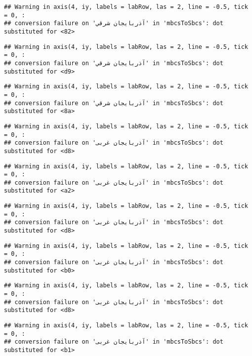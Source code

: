 \documentclass[
]{article}
\begin{document}
\begin{verbatim}
## Warning in axis(4, iy, labels = labRow, las = 2, line = -0.5, tick = 0, :
## conversion failure on 'آذربايجان شرقي' in 'mbcsToSbcs': dot substituted for <82>
\end{verbatim}

\begin{verbatim}
## Warning in axis(4, iy, labels = labRow, las = 2, line = -0.5, tick = 0, :
## conversion failure on 'آذربايجان شرقي' in 'mbcsToSbcs': dot substituted for <d9>
\end{verbatim}

\begin{verbatim}
## Warning in axis(4, iy, labels = labRow, las = 2, line = -0.5, tick = 0, :
## conversion failure on 'آذربايجان شرقي' in 'mbcsToSbcs': dot substituted for <8a>
\end{verbatim}

\begin{verbatim}
## Warning in axis(4, iy, labels = labRow, las = 2, line = -0.5, tick = 0, :
## conversion failure on 'آذربايجان غربی' in 'mbcsToSbcs': dot substituted for <d8>
\end{verbatim}

\begin{verbatim}
## Warning in axis(4, iy, labels = labRow, las = 2, line = -0.5, tick = 0, :
## conversion failure on 'آذربايجان غربی' in 'mbcsToSbcs': dot substituted for <a2>
\end{verbatim}

\begin{verbatim}
## Warning in axis(4, iy, labels = labRow, las = 2, line = -0.5, tick = 0, :
## conversion failure on 'آذربايجان غربی' in 'mbcsToSbcs': dot substituted for <d8>
\end{verbatim}

\begin{verbatim}
## Warning in axis(4, iy, labels = labRow, las = 2, line = -0.5, tick = 0, :
## conversion failure on 'آذربايجان غربی' in 'mbcsToSbcs': dot substituted for <b0>
\end{verbatim}

\begin{verbatim}
## Warning in axis(4, iy, labels = labRow, las = 2, line = -0.5, tick = 0, :
## conversion failure on 'آذربايجان غربی' in 'mbcsToSbcs': dot substituted for <d8>
\end{verbatim}

\begin{verbatim}
## Warning in axis(4, iy, labels = labRow, las = 2, line = -0.5, tick = 0, :
## conversion failure on 'آذربايجان غربی' in 'mbcsToSbcs': dot substituted for <b1>
\end{verbatim}
\end{document}
